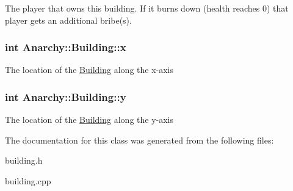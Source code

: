 The player that owns this building. If it burns down (health reaches 0) that player gets an additional bribe(s). 

\hypertarget{classAnarchy_1_1Building_a4748629dadd04cc82b3894214c764724}{
\subsubsection[{x}]{\setlength{\rightskip}{0pt plus 5cm}int Anarchy\-::\-Building\-::x}}\label{classAnarchy_1_1Building_a4748629dadd04cc82b3894214c764724}


The location of the \hyperlink{classAnarchy_1_1Building}{Building} along the x-\/axis 

\hypertarget{classAnarchy_1_1Building_a9f3e61c752dba70cec82fc293444f295}{
\subsubsection[{y}]{\setlength{\rightskip}{0pt plus 5cm}int Anarchy\-::\-Building\-::y}}\label{classAnarchy_1_1Building_a9f3e61c752dba70cec82fc293444f295}


The location of the \hyperlink{classAnarchy_1_1Building}{Building} along the y-\/axis 



The documentation for this class was generated from the following files\-:\begin{DoxyCompactItemize}
\item 
building.\-h\item 
building.\-cpp\end{DoxyCompactItemize}
